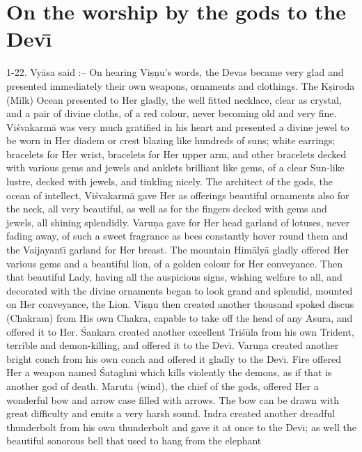 \chapter{On the worship by the gods to the Dev\={\i}}

1-22. Vy\=asa said :-- On hearing Vi\d{s}\d{n}u's words, the Devas became very glad and presented immediately their own weapons, ornaments and clothings. The K\d{s}iroda (Milk) Ocean presented to Her gladly, the well fitted necklace, clear as crystal, and a pair of divine cloths, of a red colour, never becoming old and very fine. Vi\'svakarm\=a was very much gratified in his heart and presented a divine jewel to be worn in Her diadem or crest blazing like hundreds of suns; white earrings; bracelets for Her wrist, bracelets for Her upper arm, and other bracelets decked with various gems and jewels and anklets brilliant like gems, of a clear Sun-like lustre, decked with jewels, and tinkling nicely. The architect of the gods, the ocean of intellect, Vi\'svakarm\=a gave Her as offerings beautiful ornaments also for the neck, all very beautiful, as well as for the fingers decked with gems and jewels, all shining splendidly. Varu\d{n}a gave for Her head garland of lotuses, never fading away, of such a sweet fragrance as bees constantly hover round them and the Vaijayant\={\i} garland for Her breast. The mountain Him\=aly\=a gladly offered Her various gems and a beautiful lion, of a golden colour for Her conveyance. Then that beautiful Lady, having all the auspicious signs, wishing welfare to all, and decorated with the divine ornaments began to look grand and splendid, mounted on Her conveyance, the Lion. Vi\d{s}\d{n}u then created another thousand spoked discus (Chakram) from His own Chakra, capable to take off the head of any Asura, and offered it to Her. \'Sankara created another excellent Tri\'s\=ula from his own Trident, terrible and demon-killing, and offered it to the Dev\={\i}. Varu\d{n}a created another bright conch from his own conch and offered it gladly to the Dev\={\i}. Fire offered Her a weapon named \'Sataghni which kills violently the demons, as if that is another god of death. Maruta (wind), the chief of the gods, offered Her a wonderful bow and arrow case filled with arrows. The bow can be drawn with great difficulty and emits a very harsh sound. Indra created another dreadful thunderbolt from his own thunderbolt and gave it at once to the Dev\={\i}; as well the beautiful sonorous bell that used to hang from the elephant

